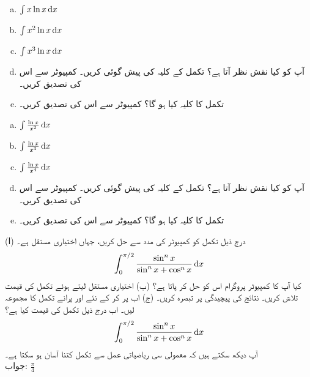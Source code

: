 \begin{multicols}{3}
\begin{enumerate}[a.]
\item
$\int x\ln x\dif x$
\item
$\int x^2\ln x\dif x$
\item
$\int x^3\ln x\dif x$
\item
آپ کو کیا نقش نظر آتا ہے؟ تکمل  کے کلیہ کی پیش گوئی کریں۔ کمپیوٹر سے اس کی تصدیق کریں۔
\item
تکمل  کا کلیہ کیا ہو گا؟ کمپیوٹر سے اس کی تصدیق کریں۔
\end{enumerate}
\end{multicols}
\begin{multicols}{3}
\begin{enumerate}[a.]
\item
$\int \frac{\ln x}{x^2}\dif x$
\item
$\int \frac{\ln x}{x^3}\dif x$
\item
$\int \frac{\ln x}{x^4}\dif x$
\item
آپ کو کیا نقش نظر آتا ہے؟ تکمل  کے کلیہ کی پیش گوئی کریں۔ کمپیوٹر سے اس کی تصدیق کریں۔
\item
تکمل  کا کلیہ کیا ہو گا؟ کمپیوٹر سے اس کی تصدیق کریں۔
\end{enumerate}
\end{multicols}
(ا) درج ذیل تکمل کو کمپیوٹر کی مدد سے حل کریں، جہاں  اختیاری مستقل ہے۔
\begin{align*}
\int_0^{\pi/2}\frac{\sin^n x}{\sin^n x+\cos^n x}\dif x
\end{align*}
کیا آپ کا کمپیوٹر پروگرام اس کو حل کر پاتا ہے؟   (ب) اختیاری مستقل  لیتے ہوئے تکمل کی قیمت تلاش کریں۔ نتائج کی پیچیدگی پر تبصرہ کریں۔ (ج) اب  پر کر کے نئے اور پرانے تکمل کا مجموعہ لیں۔ اب درج ذیل تکمل کی  قیمت کیا ہے؟
\begin{align*}
\int_0^{\pi/2}\frac{\sin^nx}{\sin^nx+\cos^nx}\dif x
\end{align*}
آپ دیکھ سکتے ہیں کہ معمولی سی ریاضیاتی عمل سے تکمل کتنا آسان ہو سکتا ہے۔\\
جواب:\quad
$\tfrac{\pi}{4}$


